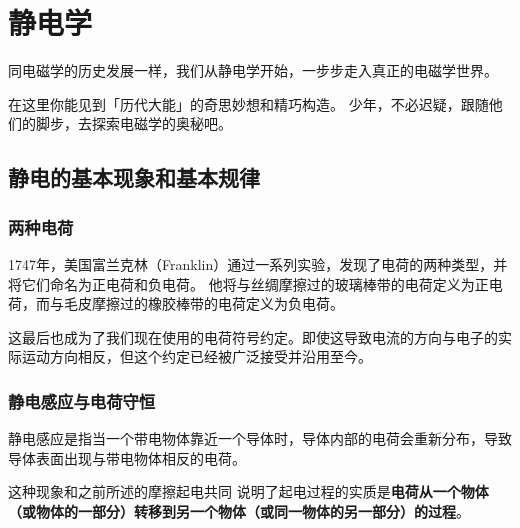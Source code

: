 \chapter{静电学}\label{chap:electrostatics}

\begin{intro}
    同电磁学的历史发展一样，我们从静电学开始，一步步走入真正的电磁学世界。

    在这里你能见到「历代大能」的奇思妙想和精巧构造。
    少年，不必迟疑，跟随他们的脚步，去探索电磁学的奥秘吧。
\end{intro}

\section{静电的基本现象和基本规律}

\subsection{两种电荷}
1747年，美国富兰克林（Franklin）通过一系列实验，发现了电荷的两种类型，并将它们命名为正电荷和负电荷。
他将与丝绸摩擦过的玻璃棒带的电荷定义为正电荷，而与毛皮摩擦过的橡胶棒带的电荷定义为负电荷。

这最后也成为了我们现在使用的电荷符号约定。即使这导致电流的方向与电子的实际运动方向相反，但这个约定已经被广泛接受并沿用至今。

\subsection{静电感应与电荷守恒}
静电感应是指当一个带电物体靠近一个导体时，导体内部的电荷会重新分布，导致导体表面出现与带电物体相反的电荷。

这种现象和之前所述的摩擦起电共同 说明了起电过程的实质是\textbf{电荷从一个物体（或物体的一部分）转移到另一个物体（或同一物体的另一部分）的过程}。

